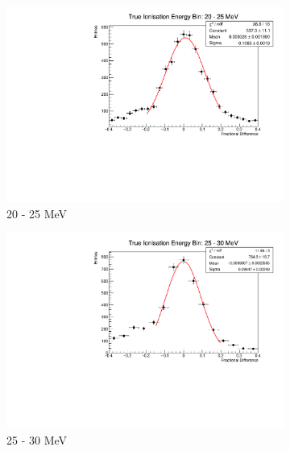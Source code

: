 \begin{figure}
\begin{subfigure}[b]{0.49\textwidth}
		\includegraphics[width=\textwidth]{figures/ion_res_20.pdf}
		\caption {20 - 25 MeV}
	\end{subfigure}
	\hfill
	\begin{subfigure}[b]{0.49\textwidth}
		\centering
		\vspace{5mm}
		\includegraphics[width=\textwidth]{figures/ion_res_25.pdf}
		\caption {25 - 30 MeV}
		\label{fig:ion_fit_25}
	\end{subfigure}
	\begin{subfigure}[b]{0.49\textwidth}
		\centering
		\vspace{5mm}

\end{subfigure}
\end{figure}

